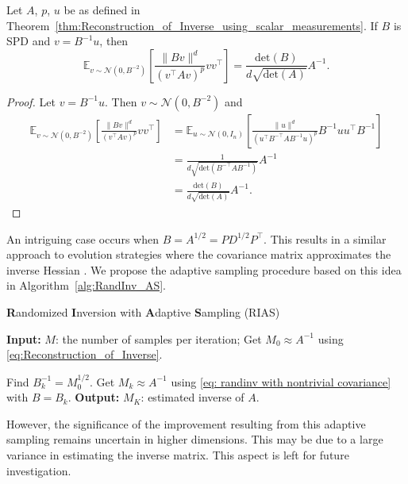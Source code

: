 \begin{corollary}
    Let $A$, $p$, $u$ be as defined in Theorem~\ref{thm:Reconstruction_of_Inverse_using_scalar_measurements}. If $B$ is SPD and $v = B^{-1}u$, then
    \begin{equation}\label{eq: randinv with nontrivial covariance}
        \mathbb{E}_{v\sim \mathcal{N}(0,B^{-2})}\left[
        \frac{\|Bv\|^d }{(v^{\top}Av)^p}vv^{\top}
        \right] = \frac{\mathrm{det}(B)}{d \sqrt{\mathrm{det}(A)}} A^{-1}.
    \end{equation}
\end{corollary}
\begin{proof}
    Let $v = B^{-1}u$. Then $v \sim \mathcal{N}(0,B^{-2})$ and
    \begin{align*}
        \mathbb{E}_{v\sim \mathcal{N}(0,B^{-2})}\left[
        \frac{\|Bv\|^d }{(v^{\top}Av)^p}vv^{\top}
        \right]
        &= \mathbb{E}_{u\sim \mathcal{N}(0,I_n)}\left[
        \frac{\|u\|^d }{(u^{\top}B^{-\top}AB^{-1}u)^p}B^{-1}uu^{\top}B^{-1}
        \right] \\
        & = \frac{1}{d \sqrt{\mathrm{det}(B^{-\top}AB^{-1})}} A^{-1} \\
        &= \frac{\mathrm{det}(B)}{d \sqrt{\mathrm{det}(A)}} A^{-1}.
    \end{align*}
\end{proof}

An intriguing case occurs when $B = A^{1/2} = PD^{1/2}P^{\top}$. This results in a similar approach to evolution strategies where the covariance matrix approximates the inverse Hessian \cite{ye2018hessian,shir2020covariance}. We propose the adaptive sampling procedure based on this idea in Algorithm~\ref{alg:RandInv_AS}.

\begin{algorithm}[t]
    \caption{\textbf{R}andomized \textbf{I}nversion with \textbf{A}daptive \textbf{S}ampling (RIAS)}
    \label{alg:RandInv_AS}
    \begin{algorithmic}[1]
        \State \textbf{Input:} $M$: the number of samples per iteration;
        \State Get $M_0 \approx A^{-1}$ using \eqref{eq:Reconstruction_of_Inverse}.

        \State Find $B_k^{-1} = M_0^{1/2}$.
        \State Get $M_k \approx A^{-1}$ using \eqref{eq: randinv with nontrivial covariance} with $B=B_k$.
        \EndFor
        \State \textbf{Output:} $M_K$: estimated inverse of $A$.
    \end{algorithmic}
\end{algorithm}

However, the significance of the improvement resulting from this adaptive sampling remains uncertain in higher dimensions. This may be due to a large variance in estimating the inverse matrix. This aspect is left for future investigation.